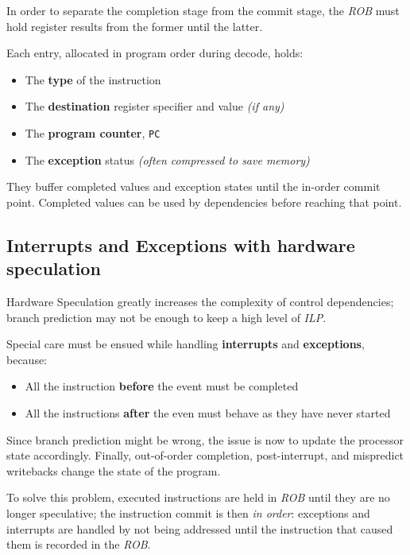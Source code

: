 \documentclass[english]{article}
\begin{document}
\bigskip
In order to separate the completion stage from the commit stage, the \textit{ROB} must hold register results from the former until the latter.

Each entry, allocated in program order during decode, holds:

\begin{itemize}
  \item The \textbf{type} of the instruction
  \item The \textbf{destination} register specifier and value \textit{(if any)}
  \item The \textbf{program counter}, \texttt{PC}
  \item The \textbf{exception} status \textit{(often compressed to save memory)}
\end{itemize}

They buffer completed values and exception states until the in-order commit point.
Completed values can be used by dependencies before reaching that point.

\subsection{Interrupts and Exceptions with hardware speculation}

Hardware Speculation greatly increases the complexity of control dependencies;
branch prediction may not be enough to keep a high level of \textit{ILP}.

Special care must be ensued while handling \textbf{interrupts} and \textbf{exceptions}, because:

\begin{itemize}
  \item All the instruction \textbf{before} the event must be completed
  \item All the instructions \textbf{after} the even must behave as they have never started
\end{itemize}

Since branch prediction might be wrong, the issue is now to update the processor state accordingly.
Finally, out-of-order completion, post-interrupt, and mispredict writebacks change the state of the program.

To solve this problem, executed instructions are held in \textit{ROB} until they are no longer speculative;
the instruction commit is then \textit{in order}: exceptions and interrupts are handled by not being addressed until the instruction that caused them is recorded in the \textit{ROB}.
\end{document}
